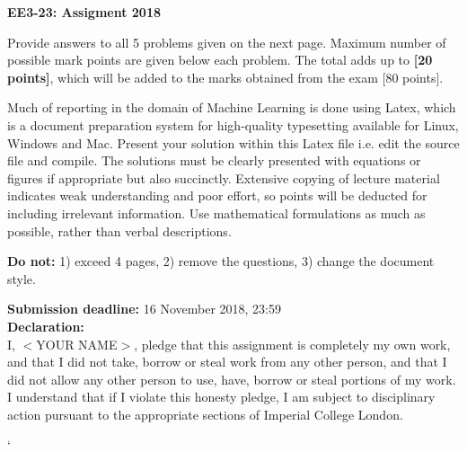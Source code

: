 \documentclass[11pt]{article}
\begin{document}
\bigskip
\bigskip

\begin{center}


\bigskip

{\Huge\textbf{EE3-23: Assigment 2018}} \\

\end{center}


Provide answers to all 5 problems given on the next page. Maximum number of possible mark points are given below each problem. The total adds up to  {\bf[20 points]}, which will be added to the marks obtained from the exam { [80 points]}.


 Much of reporting in the domain of Machine Learning is done using Latex, which is a document preparation system for high-quality typesetting available for Linux, Windows and Mac. Present your solution within this Latex file i.e. edit the source file and compile. The solutions must be clearly presented with equations or figures if appropriate but also succinctly.   Extensive copying of lecture material indicates weak understanding and poor effort, so points will be deducted for including irrelevant information. Use mathematical formulations as much as possible, rather than verbal descriptions. 
 
{\bf Do not:} 1) exceed { 4 pages}, 2) remove the questions, 3) change the document style. 

\bigskip
{\bf Submission deadline:} 16 November 2018, 23:59 \\

{\bf Declaration:}\\
I,	$<$YOUR NAME$>$, pledge that this assignment is completely my own work, and that I did not take, borrow or steal work from any other person, and that I did not allow any other person to use, have, borrow or steal portions of my work. I understand that if I violate this honesty pledge, I am subject to disciplinary action pursuant to the appropriate sections of Imperial College London.


\newpage



`


\end{document}
